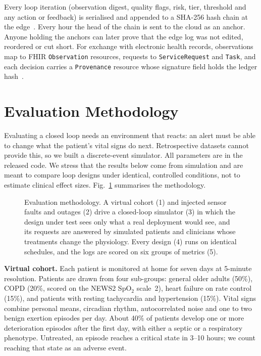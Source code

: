 \documentclass[journal]{IEEEtran}
\begin{document}
Every loop iteration (observation digest, quality flags, risk, tier, threshold and any action or feedback) is
serialised and appended to a SHA-256 hash chain at the edge~\cite{haber1991}. Every hour the head of the chain is sent
to the cloud as an anchor. Anyone holding the anchors can later prove that the edge log was not edited, reordered or cut
short. For exchange with electronic health records, observations map to FHIR \texttt{Observation} resources, requests
to \texttt{ServiceRequest} and \texttt{Task}, and each decision carries a \texttt{Provenance} resource whose signature
field holds the ledger hash~\cite{fhir}.

\section*{Evaluation Methodology}

Evaluating a closed loop needs an environment that reacts: an alert must be able to change what the patient's vital
signs do next. Retrospective datasets cannot provide this, so we built a discrete-event simulator. All parameters are in
the released code. We stress that the results below come from simulation and are meant to compare loop designs under
identical, controlled conditions, not to estimate clinical effect sizes. Fig.~\ref{fig:method} summarises the
methodology.

\begin{figure}[t]
\centering
\resizebox{\textwidth}{!}{}
\caption{Evaluation methodology. A virtual cohort (1) and injected sensor faults and outages (2) drive a closed-loop
simulator (3) in which the design under test sees only what a real deployment would see, and its requests are answered
by simulated patients and clinicians whose treatments change the physiology. Every design (4) runs on identical
schedules, and the logs are scored on six groups of metrics (5).}
\label{fig:method}
\end{figure}

\textbf{Virtual cohort.} Each patient is monitored at home for seven days at 5-minute resolution. Patients are drawn
from four sub-groups: general older adults (50\%), COPD (20\%, scored on the NEWS2 SpO$_2$ scale~2), heart failure on
rate control (15\%), and patients with resting tachycardia and hypertension (15\%). Vital signs combine personal means,
circadian rhythm, autocorrelated noise and one to two benign exertion episodes per day. About 40\% of patients develop
one or more deterioration episodes after the first day, with either a septic or a respiratory phenotype. Untreated, an
episode reaches a critical state in 3--10 hours; we count reaching that state as an adverse event.
\end{document}
